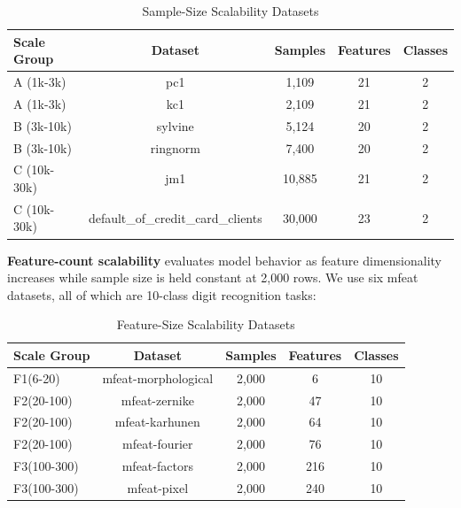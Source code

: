 \documentclass{SYSUReport}
\begin{document}
\begin{table}[H]
    \centering
    \caption{Sample-Size Scalability Datasets}
    \label{tab: Sample-size}
    \begin{tabular}{l|c|c|c|c}
        \hline
        Scale Group     & Dataset       &Samples        &Features       &Classes    \\
        \hline
        A (1k-3k)       & pc1           &1{,}109           &21             &2          \\
        A (1k-3k)       & kc1           &2{,}109           &21             &2          \\
        B (3k-10k)      & sylvine       &5{,}124           &20             &2          \\
        B (3k-10k)      & ringnorm      &7{,}400           &20             &2          \\
        C (10k-30k)     & jm1           &10{,}885          &21             &2          \\
        C (10k-30k)     & default\_of\_credit\_card\_clients  &30{,}000    &23 &2          \\
        \hline
    \end{tabular}
\end{table}

\textbf{Feature-count scalability} evaluates model behavior as feature dimensionality increases while sample size is held constant at 2,000 rows. We use six mfeat datasets, all of which are 10-class digit recognition tasks:

\begin{table}[htbp]
    \centering
    \caption{Feature-Size Scalability Datasets}
    \label{tab: Feature-size}
    \begin{tabular}{l|c|c|c|c}
        \hline
        Scale Group     & Dataset       &Samples        &Features       &Classes    \\
        \hline
        F1(6-20) & mfeat-morphological &2{,}000 &6 &10 \\
        F2(20-100) & mfeat-zernike &2{,}000 &47 &10 \\
        F2(20-100) & mfeat-karhunen &2{,}000 &64 &10 \\
        F2(20-100) & mfeat-fourier &2{,}000 &76 &10 \\
        F3(100-300) & mfeat-factors &2{,}000 &216 &10 \\
        F3(100-300) & mfeat-pixel &2{,}000 &240 &10 \\
        \hline
    \end{tabular}
\end{table}
\end{document}
